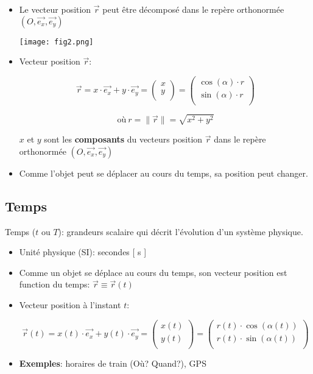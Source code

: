 \documentclass[
    11pt,
    a4paper,
    oneside,
    headinlcude, footinclude,
    twoside,
]{report}
\newcommand{\myVector}[3]{\begin{pmatrix}#1\\#2\\#3\end{pmatrix}}
\renewcommand{\vec}[1]{\overrightarrow{#1}}
\begin{document}
\begin{itemize}
\item Le vecteur position $\vec r$ peut être décomposé dans le repère orthonormée
$(O, \vec{e_{x}}, \vec{e_{y}})$

\begin{center}
\texttt{[image: fig2.png]}
\end{center}

\item Vecteur position $\vec r$:

\begin{equation}
\vec r = x \cdot \vec{e_{x}} + y \cdot \vec{e_{y}} = \myVector{x}{y}{}
= \myVector{\cos(\alpha)\cdot r}{\sin(\alpha)\cdot r}{}
\end{equation}

$$ \textrm{où}\ r = \| \vec r \| = \sqrt{x^{2} + y^{2}}$$
         
$x$ et $y$ sont les \textbf{composants} du vecteurs position $\vec r$
dans le repère orthonormée $(O, \vec{e_{x}}, \vec{e_{y}})$

\item Comme l'objet peut se déplacer au cours du temps, sa position peut
changer.
\end{itemize}

\subsection{Temps}
\label{sub:temps}

Temps ($t$ ou $T$): grandeurs scalaire qui décrit l'évolution d'un système
physique.

\begin{itemize}
\item Unité physique (SI): secondes [ s ]

\item Comme un objet se déplace au cours du temps, son vecteur position
est function du temps: $\vec r \equiv \vec r (t)$

\item Vecteur position à l'instant $t$:

\begin{equation}
\vec r (t) = x(t) \cdot \vec{e_{x}} + y(t) \cdot \vec{e_{y}} =
\myVector{x(t)}{y(t)}{} = \myVector{r(t) \cdot \cos(\alpha(t))}{r(t) \cdot \sin(\alpha(t))}{}
\end{equation}

\item \textbf{Exemples}: horaires de train (Où? Quand?), GPS
\end{itemize}
\end{document}
